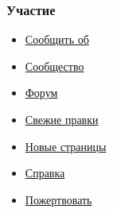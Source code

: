 \documentclass[a4paper,11pt]{article}
\begin{document}
\subsubsection{Участие}
\begin{itemize}
	\item \href{https://ru.wikipedia.org/wiki/%D0%92%D0%B8%D0%BA%D0%B8%D0%BF%D0%B5%D0%B4%D0%B8%D1%8F:%D0%A1%D0%BE%D0%BE%D0%B1%D1%89%D0%B5%D0%BD%D0%B8%D1%8F_%D0%BE%D0%B1_%D0%BE%D1%88%D0%B8%D0%B1%D0%BA%D0%B0%D1%85}{Сообщить об\nolinebreakошибке}
	\item \href{https://ru.wikipedia.org/wiki/%D0%92%D0%B8%D0%BA%D0%B8%D0%BF%D0%B5%D0%B4%D0%B8%D1%8F:%D0%A1%D0%BE%D0%BE%D0%B1%D1%89%D0%B5%D1%81%D1%82%D0%B2%D0%BE}{Сообщество}
	\item \href{https://ru.wikipedia.org/wiki/%D0%92%D0%B8%D0%BA%D0%B8%D0%BF%D0%B5%D0%B4%D0%B8%D1%8F:%D0%A4%D0%BE%D1%80%D1%83%D0%BC}{Форум}
	\item \href{https://ru.wikipedia.org/wiki/%D0%A1%D0%BB%D1%83%D0%B6%D0%B5%D0%B1%D0%BD%D0%B0%D1%8F:%D0%A1%D0%B2%D0%B5%D0%B6%D0%B8%D0%B5_%D0%BF%D1%80%D0%B0%D0%B2%D0%BA%D0%B8}{Свежие правки}
	\item \href{https://ru.wikipedia.org/wiki/%D0%A1%D0%BB%D1%83%D0%B6%D0%B5%D0%B1%D0%BD%D0%B0%D1%8F:%D0%9D%D0%BE%D0%B2%D1%8B%D0%B5_%D1%81%D1%82%D1%80%D0%B0%D0%BD%D0%B8%D1%86%D1%8B}{Новые страницы}
	\item \href{https://ru.wikipedia.org/wiki/%D0%92%D0%B8%D0%BA%D0%B8%D0%BF%D0%B5%D0%B4%D0%B8%D1%8F:%D0%A1%D0%BF%D1%80%D0%B0%D0%B2%D0%BA%D0%B0}{Справка}
	\item \href{https://donate.wikimedia.org/wiki/Special:FundraiserRedirector?utm_source=donate&amp;utm_medium=sidebar&amp;utm_campaign=C13_ru.wikipedia.org&amp;uselang=ru}{Пожертвовать}
\end{itemize}
\end{document}

